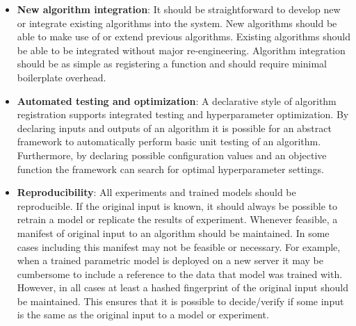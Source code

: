 \begin{itemize}

        \item \textbf{New algorithm integration}:
            It should be straightforward to develop new or integrate existing
              algorithms into the system.
            New algorithms should be able to make use of or extend previous
              algorithms.
            Existing algorithms should be able to be integrated without major
              re-engineering.
            Algorithm integration should be as simple as registering a
              function and should require minimal boilerplate overhead.

        \item \textbf{Automated testing and optimization}:
            A declarative style of algorithm registration supports integrated
              testing and hyperparameter optimization.
            By declaring inputs and outputs of an algorithm it is possible for
              an abstract framework to automatically perform basic unit testing
              of an algorithm.
            Furthermore, by declaring possible configuration values and an
              objective function the framework can search for optimal
              hyperparameter settings.

        \item \textbf{Reproducibility}:
            All experiments and trained models should be reproducible.
            If the original input is known, it should always be possible to
              retrain a model or replicate the results of experiment.
            Whenever feasible, a manifest of original input to an algorithm
              should be maintained.
            In some cases including this manifest may not be feasible or
              necessary.
            For example, when a trained parametric model is deployed on a new
              server it may be cumbersome to include a reference to the data
              that model was trained with.
            However, in all cases at least a hashed fingerprint of the
              original input should be maintained.
            This ensures that it is possible to decide/verify if some input is
              the same as the original input to a model or experiment.


\end{itemize}
